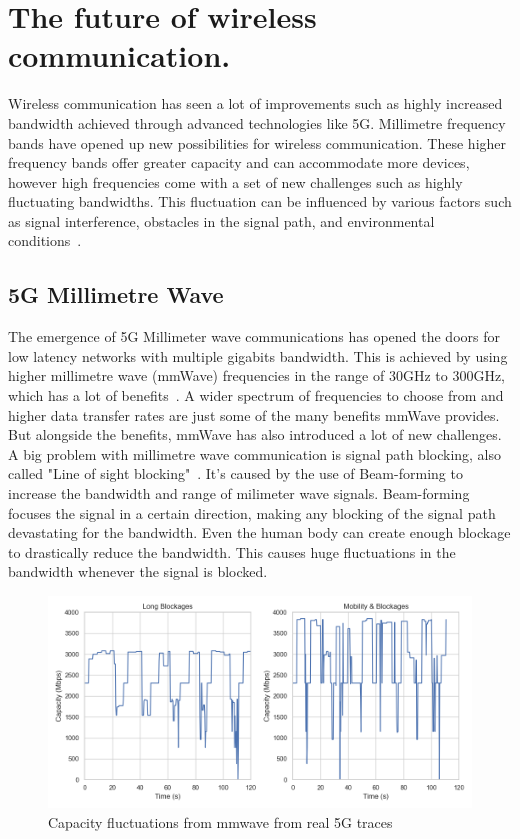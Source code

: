 \documentclass[a4paper,english, 11pt]{report}
\begin{document}
\section{The future of wireless communication.}
Wireless communication has seen a lot of improvements such as highly increased bandwidth achieved through advanced technologies like 5G. Millimetre frequency bands have opened up new possibilities for wireless communication. These higher frequency bands offer greater capacity and can accommodate more devices, however high frequencies come with a set of new challenges such as highly fluctuating bandwidths. This fluctuation can be influenced by various factors such as signal interference, obstacles in the signal path, and environmental conditions~\cite{4623710}.

\subsection{5G Millimetre Wave}
The emergence of 5G Millimeter wave communications has opened the doors for low latency networks with multiple gigabits bandwidth. This is achieved by using higher millimetre wave (mmWave) frequencies in the range of 30GHz to 300GHz, which has a lot of benefits~\cite{Agrawal_Sharma_2016}. A wider spectrum of frequencies to choose from and higher data transfer rates are just some of the many benefits mmWave provides. But alongside the benefits, mmWave has also introduced a lot of new challenges.\\

A big problem with millimetre wave communication is signal path blocking, also called "Line of sight blocking"~\cite{mmwave_blocking}. It's caused by the use of Beam-forming to increase the bandwidth and range of milimeter wave signals. Beam-forming focuses the signal in a certain direction, making any blocking of the signal path devastating for the bandwidth. Even the human body can create enough blockage to drastically reduce the bandwidth. This causes huge fluctuations in the bandwidth whenever the signal is blocked.\\

\begin{figure}[h!] %
	\centering
	\includegraphics[scale=0.33]{../diagrams/witestlab/lb_mobb.png}
  	\caption{Capacity fluctuations from mmwave from real 5G traces~\cite{Srivastava_Fund_Panwar_2020}}
  	\label{fig:blockage}
\end{figure}
\end{document}
